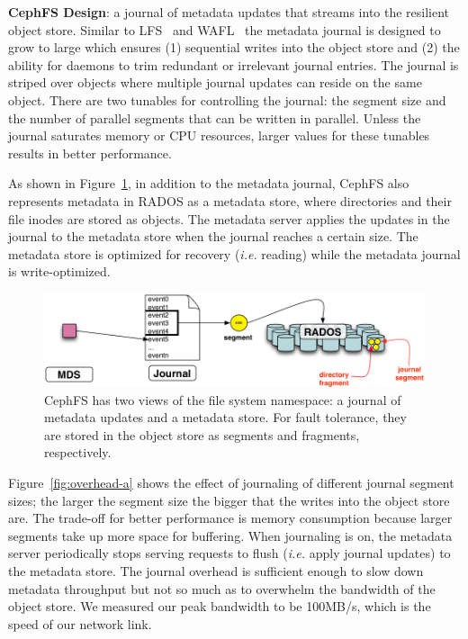 \noindent\textbf{CephFS Design}: a journal of metadata updates that streams into
the resilient object store. Similar to LFS~\cite{rosenblum:acm1992-LFS} and
WAFL~\cite{hitz:wtec1994-WAFL} the metadata journal is designed to grow to large which
ensures (1) sequential writes into the object store and (2) the ability for daemons to
trim redundant or irrelevant journal entries.  The journal is striped over
objects where multiple journal updates can reside on the same object. There are
two tunables for controlling the journal: the segment size and the number of
parallel segments that can be written in parallel. Unless the journal saturates 
memory or CPU resources, larger values for these tunables results in better
performance.

As shown in Figure~\ref{fig:journal}, in addition to the metadata journal,
CephFS also represents metadata in RADOS as a metadata store, where directories
and their file inodes are stored as objects.  The metadata server applies the
updates in the journal to the metadata store when the journal reaches a certain
size. The metadata store is optimized for recovery ({\it i.e.} reading) while
the metadata journal is write-optimized.

\begin{figure}[tb] \centering
\includegraphics[width=1\linewidth]{./figures/journal.png} 
\caption{CephFS has two views of the file system namespace: a journal of
metadata updates and a metadata store. For fault tolerance, they are stored in
the object store as segments and fragments, respectively.
\label{fig:journal}}
\end{figure}

Figure~\ref{fig:overhead-a} shows the
effect of journaling of different journal segment sizes; the larger the segment
size the bigger that the writes into the object store are. The trade-off for
better performance is memory consumption because larger segments take up
more space for buffering. When journaling is on, 
the metadata server periodically stops serving requests to flush ({\it i.e.}
apply journal updates) to the metadata store.  The journal overhead is
sufficient enough to slow down metadata throughput but not so much as to
overwhelm the bandwidth of the object store. We measured our peak bandwidth to
be 100MB/s, which is the speed of our network link.\\

